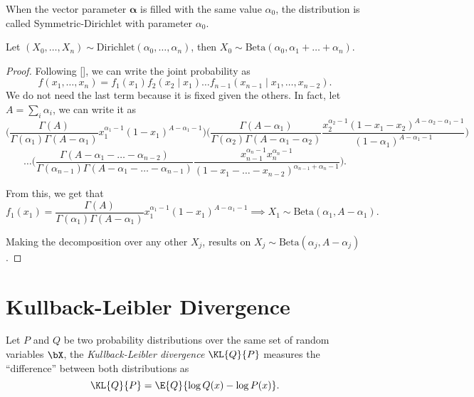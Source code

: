 When the vector parameter \(\bm{\alpha}\) is filled with the same value \(\alpha_{0}\), the distribution is called Symmetric-Dirichlet with parameter \(\alpha_{0}\).

\begin{proposition}\label{prop:dirichlet_marginal}
  Let
  \((X_{0},\dots, X_{n}) \sim \text{Dirichlet}(\alpha_{0}, \dots, \alpha_{n})\),
  then \(X_{0} \sim \text{Beta}(\alpha_{0}, \alpha_{1}+\dots+\alpha_{n})\).
\end{proposition}
\begin{proof}
  Following [\cite{farrow}], we can write the joint probability as
  \[
    f(x_{1},\dots,x_{n}) = f_{1}(x_{1})f_{2}(x_{2}\mid x_{1})\dots f_{n-1}(x_{n-1}\mid x_{1},\dots, x_{n-2}).
  \]
  We do not need the last term because it is fixed given the others. In fact, let \(A = \sum_{i} \alpha_{i}\), we can write it as
  \[
   \Bigg( \frac{\Gamma(A)}{\Gamma(\alpha_{1}) \Gamma(A - \alpha_{1})}x_{1}^{\alpha_{1}-1}(1 - x_{1})^{A - \alpha_{1} -1}\Bigg)\Bigg( \frac{\Gamma(A - \alpha_{1})}{\Gamma(\alpha_{2}) \Gamma(A - \alpha_{1} - \alpha_{2})}\frac{ x_{2}^{\alpha_{2}-1}(1-x_{1}- x_{2})^{A - \alpha_{2}- \alpha_{1} - 1} }{(1-\alpha_{1})^{A - \alpha_{1} - 1} }\Bigg )
 \]
 \[
   \dots \Big(\frac{\Gamma(A - \alpha_{1} - \dots - \alpha_{n-2})}{\Gamma(\alpha_{n-1}) \Gamma(A - \alpha_{1}- \dots - \alpha_{n-1})}  \frac{ x_{n-1}^{\alpha_{n}-1} x_{n}^{\alpha_{n}-1}}{(1-x_{1}- \dots - x_{n-2})^{\alpha_{n-1}+\alpha_{n}-1}}\Big).
 \]

 From this, we get that
 \[
   f_{1}(x_{1}) =  \frac{\Gamma(A)}{\Gamma(\alpha_{1}) \Gamma(A - \alpha_{1})}x_{1}^{\alpha_{1}-1}(1 - x_{1})^{A - \alpha_{1} -1} \implies X_{1} \sim \text{Beta}(\alpha_{1}, A- \alpha_{1}).
 \]

 Making the decomposition over any other \(X_{j}\), results on
 \(X_{j} \sim \text{Beta}(\alpha_{j}, A - \alpha_{j})\).
\end{proof}



\section{Kullback-Leibler Divergence}

\begin{definition}
  Let \(P\) and \(Q\) be two probability distributions over the same set of
  random variables \(\bX\), the \emph{Kullback-Leibler divergence}
  \(\KL{Q}{P}\) measures the ``difference'' between both distributions as
  \[
    \KL{Q}{P} = \E{Q}{\log Q(x) - \log P(x)}.
  \]
\end{definition}

